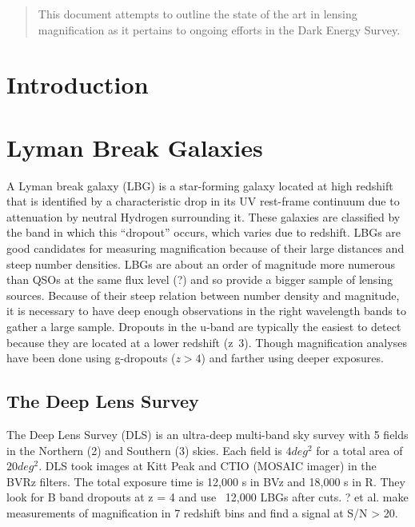 \documentclass[12pt]{article}
\begin{document}
\maketitle

\begin{abstract}
This document attempts to outline the state of the art in lensing magnification as it pertains to ongoing efforts in the Dark Energy Survey.
\end{abstract}

\section{Introduction}



\section{Lyman Break Galaxies}
A Lyman break galaxy (LBG) is a star-forming galaxy located at high redshift that is identified by a characteristic drop in its UV rest-frame continuum due to attenuation by neutral Hydrogen surrounding it. 
These galaxies are classified by the band in which this ``dropout'' occurs, which varies due to redshift.
LBGs are good candidates for measuring magnification because of their large distances and steep number densities.
LBGs are about an order of magnitude more numerous than QSOs at the same flux level (?) and so provide a bigger sample of lensing sources.
Because of their steep relation between number density and magnitude, it is necessary to have deep enough observations in the right wavelength bands to gather a large sample. 
Dropouts in the u-band are typically the easiest to detect because they are located at a lower redshift (z~3).
Though magnification analyses have been done using g-dropouts ($z>4$) and farther using deeper exposures. 


\subsection{The Deep Lens Survey}
The Deep Lens Survey (DLS) is an ultra-deep multi-band sky survey with 5 fields in the Northern (2) and Southern (3) skies. 
Each field is $4 deg^{2}$ for a total area of $20 deg^{2}$.
DLS took images at Kitt Peak and CTIO (MOSAIC imager) in the BVRz filters.
The total exposure time is 12,000 s in BVz and 18,000 s in R. 
They look for B band dropouts at z = 4 and use ~12,000 LBGs after cuts.
? et al. make measurements of magnification in 7 redshift bins and find a signal at S/N > 20.
\end{document}
